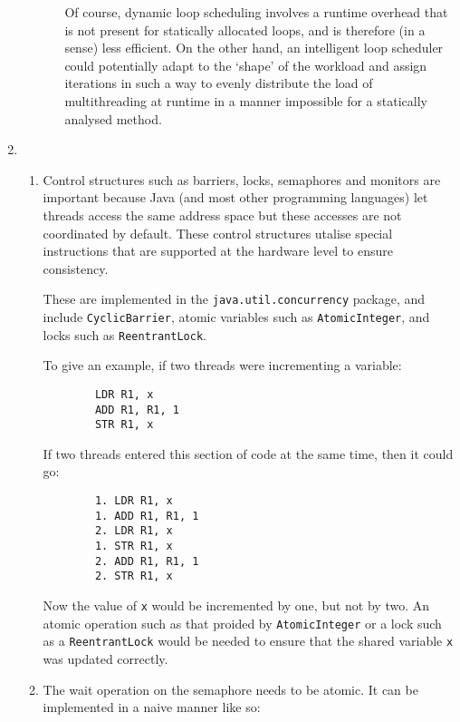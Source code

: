 \documentclass{report}
\begin{document}
\begin{enumerate}
\begin{enumerate}
\begin{enumerate}
      Of course, dynamic loop scheduling involves a runtime overhead
      that is not present for statically allocated loops, and is
      therefore (in a sense) less efficient. On the other hand, an
      intelligent loop scheduler could potentially adapt to the
      `shape' of the workload and assign iterations in such a way to
      evenly distribute the load of multithreading at runtime in a
      manner impossible for a statically analysed method.
  \end{enumerate}
  \end{enumerate}
  \item \begin{enumerate}
    \item Control structures such as barriers, locks, semaphores and
      monitors are important because Java (and most other programming
      languages) let threads access the same address space but these
      accesses are not coordinated by default. These control
      structures utalise special instructions that are supported at
      the hardware level to ensure consistency.

      These are implemented in the \texttt{java.util.concurrency}
      package, and include \texttt{CyclicBarrier}, atomic variables
      such as \texttt{AtomicInteger}, and locks such as
      \texttt{ReentrantLock}.

      To give an example, if two threads were incrementing a variable:

      \begin{verbatim}
        LDR R1, x
        ADD R1, R1, 1
        STR R1, x
      \end{verbatim}

      If two threads entered this section of code at the same time,
      then it could go:

      \begin{verbatim}
        1. LDR R1, x
        1. ADD R1, R1, 1
        2. LDR R1, x
        1. STR R1, x 
        2. ADD R1, R1, 1
        2. STR R1, x
      \end{verbatim}

      Now the value of \texttt{x} would be incremented by one, but not
      by two. An atomic operation such as that proided by
      \texttt{AtomicInteger} or a lock such as a
      \texttt{ReentrantLock} would be needed to ensure that the shared
      variable \texttt{x} was updated correctly.
    \item The wait operation on the semaphore needs to be atomic. It
      can be implemented in a naive manner like so:


\end{enumerate}
\end{enumerate}
\end{document}
